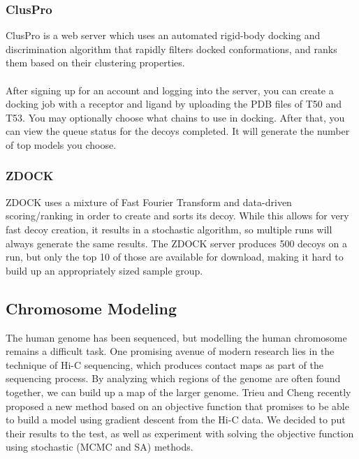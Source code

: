 \documentclass{article}
\begin{document}
\subsubsection*{ClusPro}

ClusPro is a web server which uses an automated rigid-body docking and discrimination algorithm that rapidly filters docked conformations, and ranks them based on their clustering properties.\\\\
After signing up for an account and logging into the server, you can create a docking job with a receptor and ligand by uploading the PDB files of T50 and T53. You may optionally choose what chains to use in docking. After that, you can view the queue status for the decoys completed. It will generate the number of top models you choose.


\subsubsection*{ZDOCK}

ZDOCK uses a mixture of Fast Fourier Transform and data-driven scoring/ranking in order to create and sorts its decoy. While this allows for very fast decoy creation, it results in a stochastic algorithm, so multiple runs will always generate the same results. The ZDOCK server produces 500 decoys on a run, but only the top 10 of those are available for download, making it hard to build up an appropriately sized sample group.


\subsection{Chromosome Modeling}

The human genome has been sequenced, but modelling the human chromosome remains a difficult task.  One promising avenue of modern research lies in the technique of Hi-C sequencing, which produces contact maps as part of the sequencing process.  By analyzing which regions of the genome are often found together, we can build up a map of the larger genome.  Trieu and Cheng recently proposed a new method based on an objective function that promises to be able to build a model using gradient descent from the Hi-C data.  We decided to put their results to the test, as well as experiment with solving the objective function using stochastic (MCMC and SA) methods.

\end{document}
